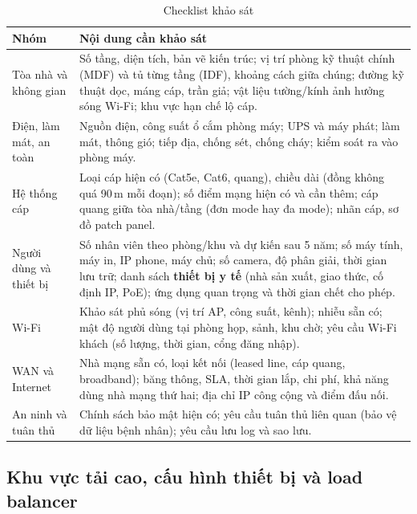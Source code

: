\begin{small}
\setlength{\tabcolsep}{4pt}
\begin{longtable}{|p{3.0cm}|p{10.8cm}|}
\caption{Checklist khảo sát} \label{tab:survey_checklist} \\
\hline
\textbf{Nhóm} & \textbf{Nội dung cần khảo sát} \\ \hline
\endhead
Tòa nhà và không gian & Số tầng, diện tích, bản vẽ kiến trúc; vị trí phòng kỹ thuật chính (MDF) và tủ từng tầng (IDF), khoảng cách giữa chúng; đường kỹ thuật dọc, máng cáp, trần giả; vật liệu tường/kính ảnh hưởng sóng Wi-Fi; khu vực hạn chế lộ cáp. \\ \hline
Điện, làm mát, an toàn & Nguồn điện, công suất ổ cắm phòng máy; UPS và máy phát; làm mát, thông gió; tiếp địa, chống sét, chống cháy; kiểm soát ra vào phòng máy. \\ \hline
Hệ thống cáp & Loại cáp hiện có (Cat5e, Cat6, quang), chiều dài (đồng không quá 90\,m mỗi đoạn); số điểm mạng hiện có và cần thêm; cáp quang giữa tòa nhà/tầng (đơn mode hay đa mode); nhãn cáp, sơ đồ patch panel. \\ \hline
Người dùng và thiết bị & Số nhân viên theo phòng/khu và dự kiến sau 5 năm; số máy tính, máy in, IP phone, máy chủ; số camera, độ phân giải, thời gian lưu trữ; danh sách \textbf{thiết bị y tế} (nhà sản xuất, giao thức, cố định IP, PoE); ứng dụng quan trọng và thời gian chết cho phép. \\ \hline
Wi-Fi & Khảo sát phủ sóng (vị trí AP, công suất, kênh); nhiễu sẵn có; mật độ người dùng tại phòng họp, sảnh, khu chờ; yêu cầu Wi-Fi khách (số lượng, thời gian, cổng đăng nhập). \\ \hline
WAN và Internet & Nhà mạng sẵn có, loại kết nối (leased line, cáp quang, broadband); băng thông, SLA, thời gian lắp, chi phí, khả năng dùng nhà mạng thứ hai; địa chỉ IP công cộng và điểm đấu nối. \\ \hline
An ninh và tuân thủ & Chính sách bảo mật hiện có; yêu cầu tuân thủ liên quan (bảo vệ dữ liệu bệnh nhân); yêu cầu lưu log và sao lưu. \\ \hline
\end{longtable}
\end{small}

\subsection{Khu vực tải cao, cấu hình thiết bị và load balancer}


